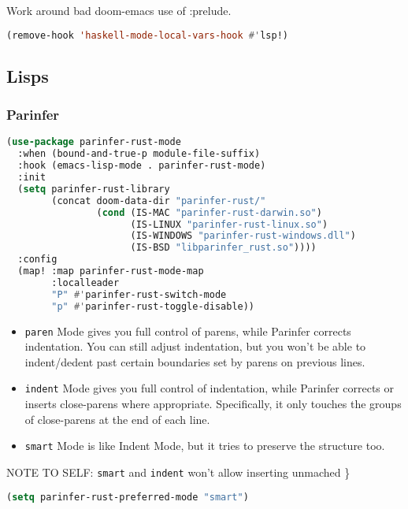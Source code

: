 \documentclass[11pt]{article}
\begin{document}
Work around bad doom-emacs use of :prelude.

\begin{lstlisting}[language=Lisp]
(remove-hook 'haskell-mode-local-vars-hook #'lsp!)
\end{lstlisting}

\subsection{Lisps}
\label{sec:lisps}


\subsubsection{Parinfer}
\label{sec:parinfer}
\begin{lstlisting}[language=Lisp]
(use-package parinfer-rust-mode
  :when (bound-and-true-p module-file-suffix)
  :hook (emacs-lisp-mode . parinfer-rust-mode)
  :init
  (setq parinfer-rust-library
        (concat doom-data-dir "parinfer-rust/"
                (cond (IS-MAC "parinfer-rust-darwin.so")
                      (IS-LINUX "parinfer-rust-linux.so")
                      (IS-WINDOWS "parinfer-rust-windows.dll")
                      (IS-BSD "libparinfer_rust.so"))))
  :config
  (map! :map parinfer-rust-mode-map
        :localleader
        "P" #'parinfer-rust-switch-mode
        "p" #'parinfer-rust-toggle-disable))
\end{lstlisting}

\begin{itemize}
  \item \texttt{paren} Mode gives you full control of parens, while Parinfer corrects
indentation. You can still adjust indentation, but you won’t be able to
indent/dedent past certain boundaries set by parens on previous lines.
  \item \texttt{indent} Mode gives you full control of indentation, while Parinfer
corrects or inserts close-parens where appropriate. Specifically, it only
touches the groups of close-parens at the end of each line.
  \item \texttt{smart} Mode is like Indent Mode, but it tries to preserve the structure too.
\end{itemize}

NOTE TO SELF: \texttt{smart} and \texttt{indent} won’t allow inserting unmached \}

\begin{lstlisting}[language=Lisp]
(setq parinfer-rust-preferred-mode "smart")
\end{lstlisting}
\end{document}
